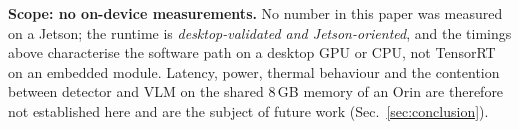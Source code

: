 \textbf{Scope: no on-device measurements.} No number in this paper was measured on a Jetson; the runtime is
\emph{desktop-validated and Jetson-oriented}, and the timings above characterise the software path on a desktop GPU
or CPU, not TensorRT on an embedded module. Latency, power, thermal behaviour and the contention between detector and
VLM on the shared 8\,GB memory of an Orin are therefore not established here and are the subject of future work
(Sec.~\ref{sec:conclusion}).
